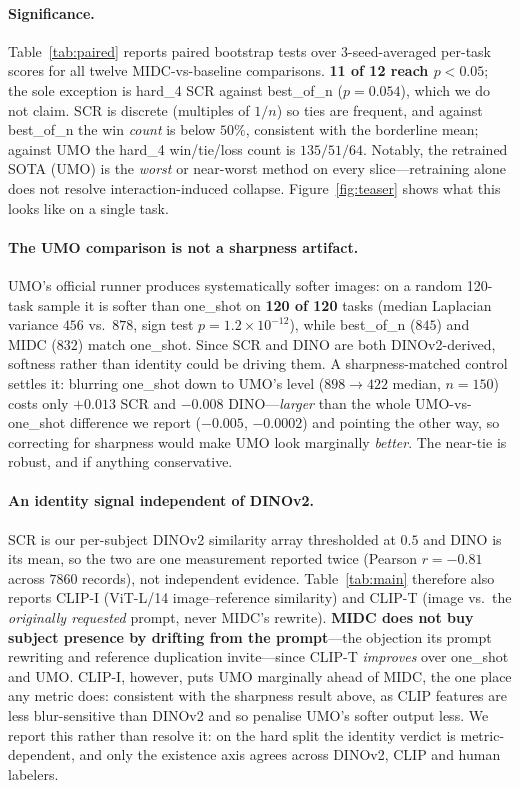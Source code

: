 \documentclass[letterpaper]{article}
\begin{document}
\paragraph{Significance.} Table~\ref{tab:paired} reports paired bootstrap tests over 3-seed-averaged per-task scores for all twelve MIDC-vs-baseline comparisons. \textbf{11 of 12 reach $p<0.05$}; the sole exception is hard\_4 SCR against best\_of\_n ($p{=}0.054$), which we do not claim. SCR is discrete (multiples of $1/n$) so ties are frequent, and against best\_of\_n the win \emph{count} is below $50\%$, consistent with the borderline mean; against UMO the hard\_4 win/tie/loss count is $135/51/64$. Notably, the retrained SOTA (UMO) is the \emph{worst} or near-worst method on every slice---retraining alone does not resolve interaction-induced collapse. Figure~\ref{fig:teaser} shows what this looks like on a single task.

\paragraph{The UMO comparison is not a sharpness artifact.} UMO's official runner produces systematically softer images: on a random 120-task sample it is softer than one\_shot on \textbf{120 of 120} tasks (median Laplacian variance $456$ vs.\ $878$, sign test $p{=}1.2{\times}10^{-12}$), while best\_of\_n ($845$) and MIDC ($832$) match one\_shot. Since SCR and DINO are both DINOv2-derived, softness rather than identity could be driving them. A sharpness-matched control settles it: blurring one\_shot down to UMO's level ($898{\to}422$ median, $n{=}150$) costs only $+0.013$ SCR and $-0.008$ DINO---\emph{larger} than the whole UMO-vs-one\_shot difference we report ($-0.005$, $-0.0002$) and pointing the other way, so correcting for sharpness would make UMO look marginally \emph{better}. The near-tie is robust, and if anything conservative.

\paragraph{An identity signal independent of DINOv2.} SCR is our per-subject DINOv2 similarity array thresholded at $0.5$ and DINO is its mean, so the two are one measurement reported twice (Pearson $r{=}{-}0.81$ across $7860$ records), not independent evidence. Table~\ref{tab:main} therefore also reports CLIP-I (ViT-L/14 image--reference similarity) and CLIP-T (image vs.\ the \emph{originally requested} prompt, never MIDC's rewrite). \textbf{MIDC does not buy subject presence by drifting from the prompt}---the objection its prompt rewriting and reference duplication invite---since CLIP-T \emph{improves} over one\_shot and UMO. CLIP-I, however, puts UMO marginally ahead of MIDC, the one place any metric does: consistent with the sharpness result above, as CLIP features are less blur-sensitive than DINOv2 and so penalise UMO's softer output less. We report this rather than resolve it: on the hard split the identity verdict is metric-dependent, and only the existence axis agrees across DINOv2, CLIP and human labelers.
\end{document}
